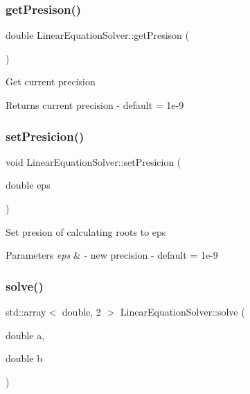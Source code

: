 \subsubsection{\texorpdfstring{get\+Presison()}{getPresison()}}
{\footnotesize\ttfamily double Linear\+Equation\+Solver\+::get\+Presison (\begin{DoxyParamCaption}{ }\end{DoxyParamCaption})}

Get current precision \begin{DoxyReturn}{Returns}
current precision -\/ default = 1e-\/9 
\end{DoxyReturn}
\mbox{\label{namespaceLinearEquationSolver_a164725181a9e9f5bf9c30409f1220279}} 
\subsubsection{\texorpdfstring{set\+Presicion()}{setPresicion()}}
{\footnotesize\ttfamily void Linear\+Equation\+Solver\+::set\+Presicion (\begin{DoxyParamCaption}\item[{double}]{eps }\end{DoxyParamCaption})}

Set presion of calculating roots to eps 
\begin{DoxyParams}{Parameters}
{\em eps} & -\/ new precision -\/ default = 1e-\/9 \\
\hline
\end{DoxyParams}
\mbox{\label{namespaceLinearEquationSolver_a5860ff179b02727c12c41318a84079da}} 
\subsubsection{\texorpdfstring{solve()}{solve()}}
{\footnotesize\ttfamily std\+::array$<$ double, 2 $>$ Linear\+Equation\+Solver\+::solve (\begin{DoxyParamCaption}\item[{double}]{a,  }\item[{double}]{b }\end{DoxyParamCaption})}

